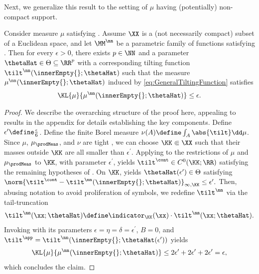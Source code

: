 \documentclass{article}
\begin{document}
Next, we generalize this result to the setting of $\mu$ having (potentially)
non-compact support.
\begin{theorem}
 \label{result:UniversalApproxJointNetworkTightness}
 Consider measure $\mu$ satisfying .
 Assume $\XX$ is a (not necessarily compact) subset of a Euclidean space, and
 let $\MM^\nn$ be a parametric family of functions satisfying
 .
 Then for every $\epsilon > 0$, there exists $p\in \NN$ and a parameter
 $\thetaHat \in \Theta \subseteq \RR^p$ with a corresponding tilting function
 $\tilt^\nn(\innerEmpty{};\thetaHat)$ such that the measure
 $\mu^\nn(\innerEmpty{};\thetaHat)$ induced by
 \eqref{eq:GeneralTiltingFunction} satisfies
 \begin{align*}
  \KL{\mu}{\mu^\nn(\innerEmpty{};\thetaHat)} \leq \epsilon.
 \end{align*}
\end{theorem}
\begin{proof} We describe the overarching structure of the proof here, appealing to results in the appendix for details establishing the key components.
 Define $\epsilon^\prime \define \frac{\epsilon}{6}$.
 Define the finite Borel measure
  $\nu(A)\define\int_A\abs{\tilt}\dd\mu$. Since $\mu$, $\mu_\prodMeas$, and
  $\nu$ are tight \cite[Lem. 13.5]{klenkeProbabilityTheoryComprehensive2020},
  we can choose $\KK\Subset\XX$ such that their masses outside $\KK$ are all
  smaller than $\epsilon^\prime$. Applying
   to the restrictions of $\mu$ and
  $\mu_\prodMeas$ to $\KK$, with parameter $\epsilon^\prime$, yields
  $\tilt^\cont\in C^0(\KK;\RR)$ satisfying the remaining hypotheses of
  .
 On $\KK$,
  yields
 $\thetaHat(\epsilon^\prime) \in \Theta$ satisfying
 $\norm{\tilt^\cont-\tilt^\nn(\innerEmpty{};\thetaHat)}_{\infty,\KK}
  \leq \epsilon^\prime.$
 Then, abusing notation to avoid proliferation of symbols, we
 redefine $\tilt^\nn$ via the tail-truncation
 \begin{align*}
  \tilt^\nn(\xx;\thetaHat) \define \indicator_{\KK}(\xx) \cdot \tilt^\nn(\xx;\thetaHat).
 \end{align*}
 Invoking  with its parameters
 $\epsilon=\eta=\delta=\epsilon^\prime$, $B=0$, and
  $\tilt^\app=\tilt^\nn(\innerEmpty{};\thetaHat(\epsilon^\prime))$ yields
 \begin{align*}
  \KL{\mu}{\mu^\nn(\innerEmpty{};\thetaHat)}
  \leq 2\epsilon^\prime+2\epsilon^\prime+2\epsilon^\prime
  =\epsilon,
 \end{align*}
 which concludes the claim.
\end{proof}
\end{document}
